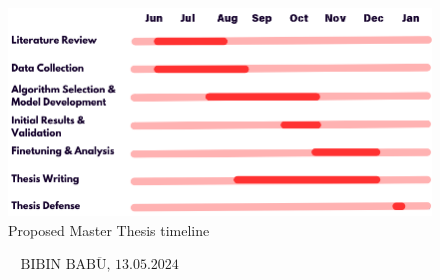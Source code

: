 \documentclass[12pt,twoside,a4paper,parskip]{scrbook} %
\def\BaAuthor{Bibin Babu}
\def\SubmitDate{13.05.2024}
\def\ShowBaAuthor{\BaAuthor}
\def\ShowBaAuthor{BIBIN BABU}
\begin{document}
\begin{figure}[H]
    \centering
    \includegraphics[width=0.9\linewidth]{figures/Thesis timeline.png} %
    \caption{Proposed Master Thesis timeline}
    \label{fig:enter-label}
\end{figure}

\FloatBarrier

\printbibliography

\vspace{20pt}
\begin{flushright}
$\overline{~~~~~~~~~~~~~~~~~\mbox{\ShowBaAuthor, \SubmitDate}~~~~~~~~~~~~~~~~~}$
\end{flushright}
\end{document}

